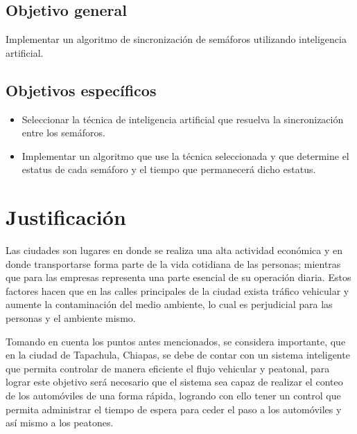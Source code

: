 \subsection*{Objetivo general}
Implementar un algoritmo de sincronización de semáforos utilizando inteligencia artificial.

\subsection*{Objetivos específicos}
\begin{itemize}
\item Seleccionar la técnica de inteligencia artificial que resuelva la sincronización entre los semáforos.
\item Implementar un algoritmo que use la técnica seleccionada y que determine el estatus de cada semáforo y el tiempo que permanecerá dicho estatus.
\end{itemize}

\section{Justificación}
Las ciudades son lugares en donde se realiza una alta actividad económica y en donde transportarse forma parte de la vida cotidiana de las personas; mientras que para las empresas representa una parte esencial de su operación diaria. Estos factores hacen que en las calles principales de la ciudad exista tráfico vehicular y aumente la contaminación del medio ambiente, lo cual es perjudicial para las personas y el ambiente mismo.

Tomando en cuenta los puntos antes mencionados, se considera importante, que en la ciudad de Tapachula, Chiapas, se debe de contar con un sistema inteligente que permita controlar de manera eficiente el flujo vehicular y peatonal, para lograr este objetivo será necesario que el sistema sea capaz de realizar el conteo de los automóviles de una forma rápida, logrando con ello tener un control que permita administrar el tiempo de espera para ceder el paso a los automóviles y así mismo a los peatones.
